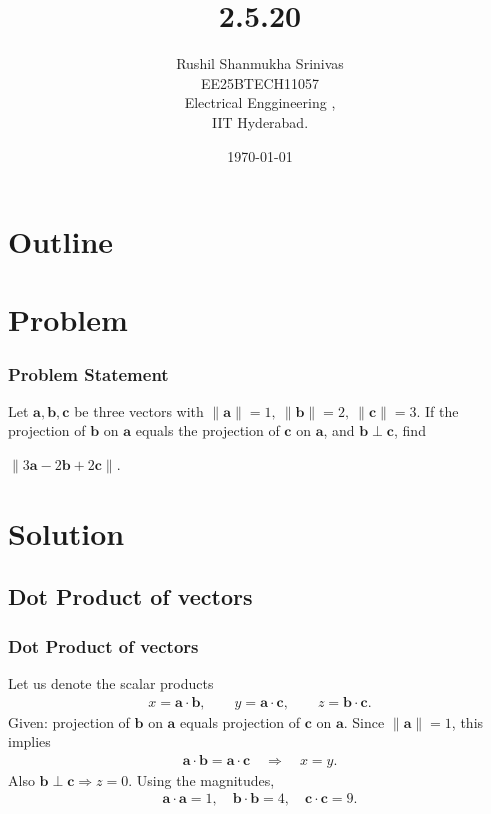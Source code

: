 \documentclass{beamer}
\title{2.5.20}
\author{Rushil Shanmukha Srinivas \\EE25BTECH11057 \\ Electrical Enggineering ,\\IIT Hyderabad.}
\date{\today}
\theoremstyle{remark}
\let\vec\mathbf
\numberwithin{equation}{section}
\begin{document}
 

\begin{frame}
\titlepage
\end{frame}

\section*{Outline}
\begin{frame}
\tableofcontents
\end{frame}
\section{Problem}
\begin{frame}
\frametitle{Problem Statement}

Let $\vec a,\vec b,\vec c$ be three vectors with $\lVert \vec a\rVert=1,\ \lVert\vec b\rVert=2,\ \lVert\vec c\rVert=3$. 
If the projection of $\vec b$ on $\vec a$ equals the projection of $\vec c$ on $\vec a$, and $\vec b\perp\vec c$, find

$\bigl\lVert 3\vec a-2\vec b+2\vec c\bigr\rVert.$

\end{frame}
\section{Solution}
\subsection{Dot Product of vectors}
\begin{frame}
\frametitle{Dot Product of vectors}
Let us denote the scalar products
\begin{align}
x=\vec a\cdot\vec b,\qquad y=\vec a\cdot\vec c,\qquad z=\vec b\cdot\vec c .
\end{align}
Given: projection of $\vec b$ on $\vec a$ equals projection of $\vec c$ on $\vec a$.
Since $\lVert\vec a\rVert=1$, this implies
\begin{align}
\vec a\cdot\vec b=\vec a\cdot\vec c \quad\Rightarrow\quad x=y.
\end{align}
Also $\vec b\perp\vec c\Rightarrow z=0$. Using the magnitudes,
\begin{align}
\vec a\cdot\vec a=1,\quad \vec b\cdot\vec b=4,\quad \vec c\cdot\vec c=9.
\end{align}

\end{frame}
\end{document}

